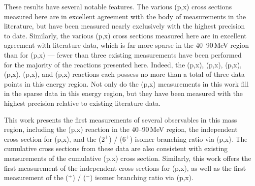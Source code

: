 
% 



These results have several notable features.
The various (p,x) cross sections measured here are in excellent agreement with the body of measurements in the literature,  but have been measured nearly exclusively with the highest precision to date.
Similarly, the various (p,x) cross sections measured here are in excellent agreement with literature data, which is far more sparse in the 40--90\,MeV region than for (p,x) ---  fewer than three existing measurements have been performed for the majority of the reactions presented here.
Indeed,  the (p,x), (p,x), (p,x), (p,x), (p,x), and (p,x) reactions each possess no more than a total of three data points in this energy region.
Not only do the (p,x) measurements in this work fill in the sparse data in this energy region, but they have been measured with the highest precision relative to existing literature data.



This work presents the first measurements of several observables in 
this mass region, including the (p,x) reaction in the 40--90\,MeV region, 
the independent cross section for       (p,x), and the  ($2^+$) /   ($6^+$)  isomer branching ratio via (p,x).  
The cumulative cross sections from these data are also consistent with existing measurements of the cumulative (p,x) cross section.
Similarly, this work offers the first measurement of the independent cross sections for (p,x),  as well as the first measurement of the      ($^+$) /    ($^-$)
isomer branching ratio via (p,x).


